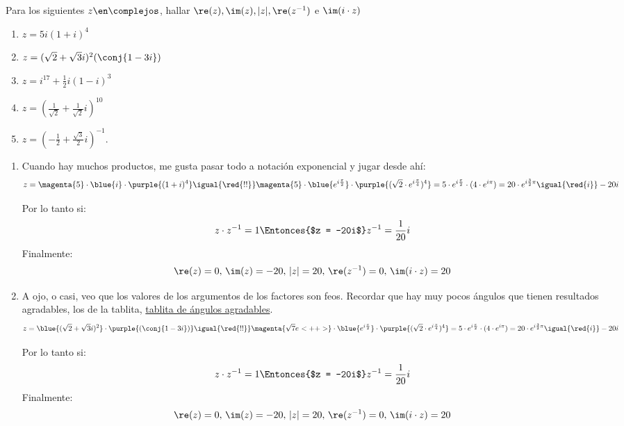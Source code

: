 \begin{enunciado}{\ejercicio}
  Para los siguientes $z \en \complejos$, hallar $\re(z), \im(z), |z|, \re(z^{-1})$ e $\im(i \cdot z)$
  \begin{multicols}{2}
    \begin{enumerate}[label=\roman*)]
      \item $z = 5 i (1+i)^4$
      \item $z = (\sqrt{2} + \sqrt{3} i)^2 (\conj{1 - 3i})$
      \item $z=i^{17} + \frac{1}{2} i (1 - i)^3$
      \item $z = \left(\frac{1}{\sqrt{2}} + \frac{1}{\sqrt{2}}i\right)^{10}$
      \item $z = \left(-\frac{1}{2} + \frac{\sqrt{3}}{2}i\right)^{-1}$.
    \end{enumerate}
  \end{multicols}
\end{enunciado}

\begin{enumerate}[label=\roman*)]

  \item  Cuando hay muchos productos, me gusta pasar todo a notación exponencial y jugar desde ahí:
        $$
          z =
          \magenta{5} \cdot \blue{i} \cdot \purple{(1+i)^4}
          \igual{\red{!!}}
          \magenta{5} \cdot \blue{e^{i\frac{\pi}{2}}} \cdot \purple{(\sqrt{2} \cdot e^{i \frac{\pi}{4}})^4}
          =
          5 \cdot e^{i\frac{\pi}{2}} \cdot (4 \cdot  e^{i \pi})
          =
          20 \cdot e^{i \frac{3}{2}\pi}
          \igual{\red{i}}
          -20i
        $$

        Por lo tanto si:
        $$
          z \cdot z^{-1} = 1
          \Entonces{$z = -20i$}
          z^{-1} = \frac{1}{20}i
        $$
        Finalmente:
        $$
          \re(z) = 0 ,\,
          \im(z) = -20 ,\,
          |z| = 20 ,\,
          \re(z^{-1}) = 0,\,
          \im(i \cdot z) = 20
        $$

  \item  
          A ojo, o casi, veo que los valores de los argumentos de los factores son feos. Recordar que hay muy pocos ángulos que tienen resultados
                agradables, los de la tablita, \hyperlink{teoria-6:tablita}{tablita de ángulos agradables}.
        $$
        z =
                \blue{(\sqrt{2} + \sqrt{3} i)^2} \cdot \purple{(\conj{1 - 3i})}
        \igual{\red{!!}}
                \magenta{\sqrt{7} e^{}<++>} \cdot \blue{e^{i\frac{\pi}{2}}} \cdot \purple{(\sqrt{2} \cdot e^{i \frac{\pi}{4}})^4}
        =
        5 \cdot e^{i\frac{\pi}{2}} \cdot (4 \cdot  e^{i \pi})
        =
        20 \cdot e^{i \frac{3}{2}\pi}
        \igual{\red{i}}
        -20i
        $$

          Por lo tanto si:
        $$
        z \cdot z^{-1} = 1
        \Entonces{$z = -20i$}
        z^{-1} = \frac{1}{20}i
        $$
          Finalmente:
        $$
        \re(z) = 0 ,\,
        \im(z) = -20 ,\,
        |z| = 20 ,\,
        \re(z^{-1}) = 0,\,
        \im(i \cdot z) = 20
        $$
\end{enumerate}

